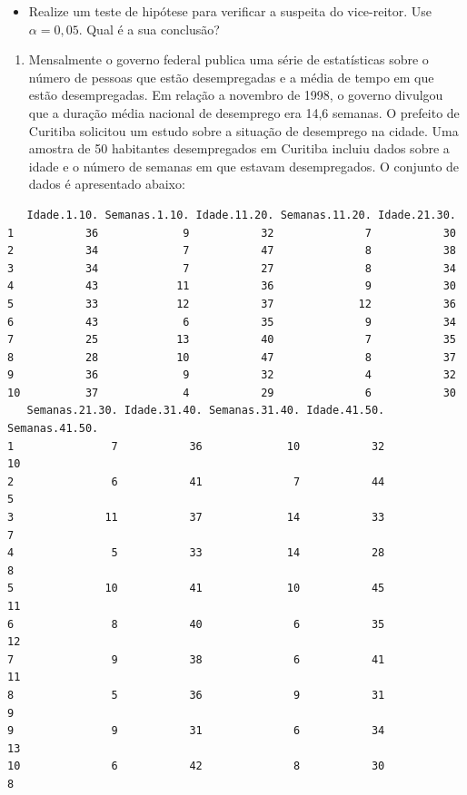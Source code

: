 \documentclass[10pt,a4paper]{book}
\providecommand{\tightlist}{%
  \setlength{\itemsep}{0pt}\setlength{\parskip}{0pt}}
\begin{document}
\begin{itemize}
\tightlist
\item
  Realize um teste de hipótese para verificar a suspeita do vice-reitor.
  Use \(\alpha = 0,05\). Qual é a sua conclusão?
\end{itemize}

\begin{enumerate}
\def\labelenumi{\arabic{enumi}.}
\setcounter{enumi}{3}
\tightlist
\item
  Mensalmente o governo federal publica uma série de estatísticas sobre
  o número de pessoas que estão desempregadas e a média de tempo em que
  estão desempregadas. Em relação a novembro de 1998, o governo divulgou
  que a duração média nacional de desemprego era 14,6 semanas. O
  prefeito de Curitiba solicitou um estudo sobre a situação de
  desemprego na cidade. Uma amostra de 50 habitantes desempregados em
  Curitiba incluiu dados sobre a idade e o número de semanas em que
  estavam desempregados. O conjunto de dados é apresentado abaixo:
\end{enumerate}

\begin{verbatim}
   Idade.1.10. Semanas.1.10. Idade.11.20. Semanas.11.20. Idade.21.30.
1           36             9           32              7           30
2           34             7           47              8           38
3           34             7           27              8           34
4           43            11           36              9           30
5           33            12           37             12           36
6           43             6           35              9           34
7           25            13           40              7           35
8           28            10           47              8           37
9           36             9           32              4           32
10          37             4           29              6           30
   Semanas.21.30. Idade.31.40. Semanas.31.40. Idade.41.50. Semanas.41.50.
1               7           36             10           32             10
2               6           41              7           44              5
3              11           37             14           33              7
4               5           33             14           28              8
5              10           41             10           45             11
6               8           40              6           35             12
7               9           38              6           41             11
8               5           36              9           31              9
9               9           31              6           34             13
10              6           42              8           30              8
\end{verbatim}
\end{document}
